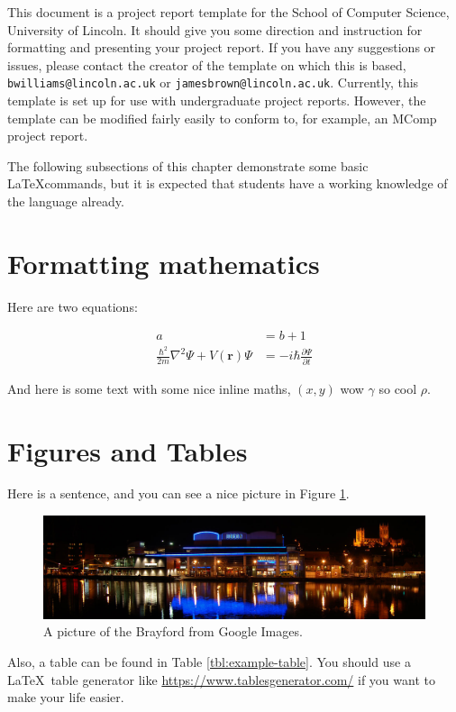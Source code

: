 This document is a project report template for the School of Computer Science, University of Lincoln. It should give you some direction and instruction for formatting and presenting your project report. If you have any suggestions or issues, please contact the creator of the template on which this is based, \texttt{bwilliams@lincoln.ac.uk} or \texttt{jamesbrown@lincoln.ac.uk}. Currently, this template is set up for use with undergraduate project reports. However, the template can be modified fairly easily to conform to, for example, an MComp project report.

The following subsections of this chapter demonstrate some basic \LaTeX commands, but it is expected that students have a working knowledge of the language already.

\section{Formatting mathematics}
Here are two equations:

\begin{align}
a &= b + 1 \\
\frac{\hbar^2}{2m}\nabla^2\Psi + V(\mathbf{r})\Psi
&= -i\hbar \frac{\partial\Psi}{\partial t}    
\end{align}


And here is some text with some nice inline maths, $(x, y)$ wow $\gamma$ so cool $\rho$.

\section{Figures and Tables}

Here is a sentence, and you can see a nice picture in Figure \ref{fig:brayford}.

\begin{figure}[h]
    \centering
    \includegraphics[width=\textwidth]{figures/brayford.jpg}
    \caption{A picture of the Brayford from Google Images.}
    \label{fig:brayford}
\end{figure}

Also, a table can be found in Table \ref{tbl:example-table}. You should use a \LaTeX~table generator like \url{https://www.tablesgenerator.com/} if you want to make your life easier.


